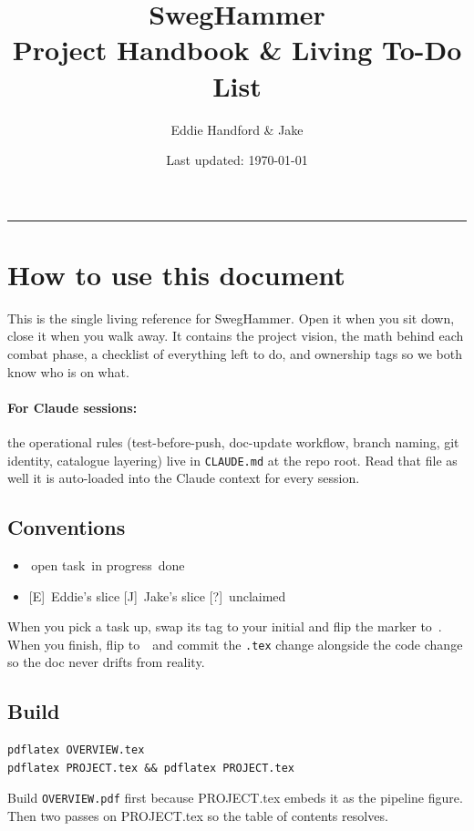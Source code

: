 \documentclass[11pt,a4paper]{article}
\title{\textbf{SwegHammer}\\\large Project Handbook \& Living To-Do List}
\author{Eddie Handford \& Jake}
\date{Last updated: \today}
\newcommand{\eddie}{\textcolor{eddieblue}{\textsf{[E]}}}
\newcommand{\jake}{\textcolor{jakeorange}{\textsf{[J]}}}
\newcommand{\either}{\textcolor{eithergrey}{\textsf{[?]}}}
\newcommand{\todo}{\ding{109}\,}    %
\newcommand{\wip}{\ding{72}\,}      %
\newcommand{\done}{\ding{51}\,}     %
\begin{document}
\maketitle

\tableofcontents
\bigskip\hrule\bigskip

\section{How to use this document}

This is the single living reference for SwegHammer. Open it when you sit
down, close it when you walk away. It contains the project vision, the
math behind each combat phase, a checklist of everything left to do, and
ownership tags so we both know who is on what.

\paragraph{For Claude sessions:} the operational rules
(test-before-push, doc-update workflow, branch naming, git identity,
catalogue layering) live in \texttt{CLAUDE.md} at the repo root. Read
that file as well \textemdash{} it is auto-loaded into the Claude
context for every session.

\subsection*{Conventions}
\begin{itemize}[itemsep=2pt]
  \item \todo open task \quad \wip in progress \quad \done done
  \item \eddie\ Eddie's slice \quad \jake\ Jake's slice \quad \either\ unclaimed
\end{itemize}

When you pick a task up, swap its tag to your initial and flip the marker
to \wip. When you finish, flip to \done\ and commit the \texttt{.tex}
change alongside the code change so the doc never drifts from reality.

\subsection*{Build}
\begin{verbatim}
pdflatex OVERVIEW.tex
pdflatex PROJECT.tex && pdflatex PROJECT.tex
\end{verbatim}
Build \texttt{OVERVIEW.pdf} first because PROJECT.tex embeds it as the
pipeline figure. Then two passes on PROJECT.tex so the table of
contents resolves.
\end{document}
